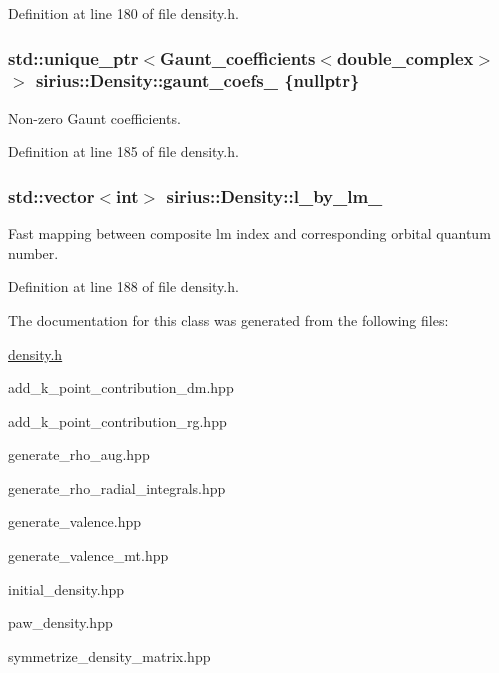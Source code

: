 Definition at line 180 of file density.\+h.

\hypertarget{classsirius_1_1_density_acee7a0147e974ac60cedc82d903f70d4}{}
\subsubsection[{gaunt\+\_\+coefs\+\_\+}]{\setlength{\rightskip}{0pt plus 5cm}std\+::unique\+\_\+ptr$<${\bf Gaunt\+\_\+coefficients}$<$double\+\_\+complex$>$ $>$ sirius\+::\+Density\+::gaunt\+\_\+coefs\+\_\+ \{{\bf nullptr}\}\hspace{0.3cm}{\ttfamily [private]}}\label{classsirius_1_1_density_acee7a0147e974ac60cedc82d903f70d4}


Non-\/zero Gaunt coefficients. 



Definition at line 185 of file density.\+h.

\hypertarget{classsirius_1_1_density_ade06e0d3019316f0cf544a5bc2303776}{}
\subsubsection[{l\+\_\+by\+\_\+lm\+\_\+}]{\setlength{\rightskip}{0pt plus 5cm}std\+::vector$<$int$>$ sirius\+::\+Density\+::l\+\_\+by\+\_\+lm\+\_\+\hspace{0.3cm}{\ttfamily [private]}}\label{classsirius_1_1_density_ade06e0d3019316f0cf544a5bc2303776}


Fast mapping between composite lm index and corresponding orbital quantum number. 



Definition at line 188 of file density.\+h.



The documentation for this class was generated from the following files\+:\begin{DoxyCompactItemize}
\item 
\hyperlink{density_8h}{density.\+h}\item 
add\+\_\+k\+\_\+point\+\_\+contribution\+\_\+dm.\+hpp\item 
add\+\_\+k\+\_\+point\+\_\+contribution\+\_\+rg.\+hpp\item 
generate\+\_\+rho\+\_\+aug.\+hpp\item 
generate\+\_\+rho\+\_\+radial\+\_\+integrals.\+hpp\item 
generate\+\_\+valence.\+hpp\item 
generate\+\_\+valence\+\_\+mt.\+hpp\item 
initial\+\_\+density.\+hpp\item 
paw\+\_\+density.\+hpp\item 
symmetrize\+\_\+density\+\_\+matrix.\+hpp\end{DoxyCompactItemize}
